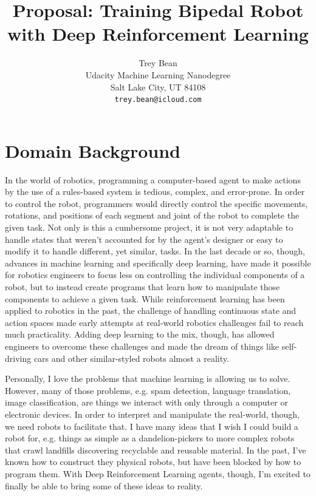 \documentclass{article}
\title{Proposal: Training Bipedal Robot with Deep Reinforcement Learning}
\author{
  Trey Bean \\
  Udacity Machine Learning Nanodegree\\
  Salt Lake City, UT 84108 \\
  \texttt{trey.bean@icloud.com} \\
}
\begin{document}
\maketitle





\section{Domain Background}
\label{sec:background}
In the world of robotics, programming a computer-based agent to make actions by the use of a rules-based system is tedious, complex, and error-prone. In order to control the robot, programmers would directly control the specific movements, rotations, and positions of each segment and joint of the robot to complete the given task. Not only is this a cumbersome project, it is not very adaptable to handle states that weren't accounted for by the agent's designer or easy to modify it to handle different, yet similar, tasks. In the last decade or so, though, advances in machine learning and specifically deep learning, have made it possible for robotics engineers to focus less on controlling the individual components of a robot, but to instead create programs that learn how to manipulate those components to achieve a given task. While reinforcement learning has been applied to robotics in the past, the challenge of handling continuous state and action spaces made early attempts at real-world robotics challenges fail to reach much practicality. Adding deep learning to the mix, though, has allowed engineers to overcome these challenges and made the dream of things like self-driving cars and other similar-styled robots almost a reality. 

Personally, I love the problems that machine learning is allowing us to solve. However, many of those problems, e.g. spam detection, language translation, image classification, are things we interact with only through a computer or electronic devices. In order to interpret and manipulate the real-world, though, we need robots to facilitate that. I have many ideas that I wish I could build a robot for, e.g. things as simple as a dandelion-pickers to more complex robots that crawl landfills discovering recyclable and reusable material. In the past, I've known how to construct they physical robots, but have been blocked by how to program them. With Deep Reinforcement Learning agents, though, I'm excited to finally be able to bring some of these ideas to reality.
\end{document}
